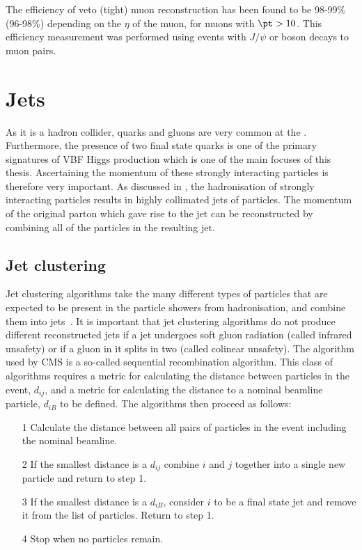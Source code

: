 The efficiency of veto (tight) muon reconstruction has been found to be 98-99\% (96-98\%) depending on the $\eta$ of the muon, for muons with $\pt>10$\GeV. This efficiency measurement was performed using events with $J/\psi$ or \PZ boson decays to muon pairs.

\section{Jets}
\label{sec:jets}
As it is a hadron collider, quarks and gluons are very common at the \LHC. Furthermore, the presence of two final state quarks is one of the primary signatures of \ac{VBF} Higgs production which is one of the main focuses of this thesis. Ascertaining the momentum of these strongly interacting particles is therefore very important. As discussed in , the hadronisation of strongly interacting particles results in highly collimated jets of particles. The momentum of the original parton which gave rise to the jet can be reconstructed by combining all of the particles in the resulting jet.


\subsection{Jet clustering}
\label{sec:jetclustering}
Jet clustering algorithms take the many different types of particles that are expected to be present in the particle showers from hadronisation, and combine them into jets~\cite{Salam:2009jx}. It is important that jet clustering algorithms do not produce different reconstructed jets if a jet undergoes soft gluon radiation (called infrared unsafety) or if a gluon in it splits in two (called colinear unsafety). The algorithm used by CMS is a so-called sequential recombination algorithm. This class of algorithms requires a metric for calculating the distance between particles in the event, $d_{ij}$, and a metric for calculating the distance to a nominal beamline particle, $d_{iB}$ to be defined. The algorithms then proceed as follows:
\begin{itemize}
\item[1] Calculate the distance between all pairs of particles in the event including the nominal beamline.
\item[2] If the smallest distance is a $d_{ij}$ combine $i$ and $j$ together into a single new particle and return to step 1.
\item[3] If the smallest distance is a $d_{iB}$, consider $i$ to be a final state jet and remove it from the list of particles. Return to step 1.
\item[4] Stop when no particles remain.
\end{itemize}

